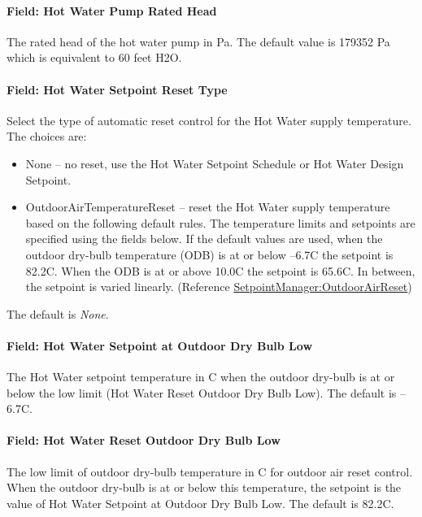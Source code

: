 \paragraph{Field: Hot Water Pump Rated Head}\label{field-hot-water-pump-rated-head}

The rated head of the hot water pump in Pa. The default value is 179352 Pa which is equivalent to 60 feet H2O.

\paragraph{Field: Hot Water Setpoint Reset Type}\label{field-hot-water-setpoint-reset-type}

Select the type of automatic reset control for the Hot Water supply temperature. The choices are:

\begin{itemize}
\item
  None -- no reset, use the Hot Water Setpoint Schedule or Hot Water Design Setpoint.
\item
  OutdoorAirTemperatureReset -- reset the Hot Water supply temperature based on the following default rules. The temperature limits and setpoints are specified using the fields below. If the default values are used, when the outdoor dry-bulb temperature (ODB) is at or below --6.7C the setpoint is 82.2C. When the ODB is at or above 10.0C the setpoint is 65.6C. In between, the setpoint is varied linearly. (Reference \hyperref[setpointmanageroutdoorairreset]{SetpointManager:OutdoorAirReset})
\end{itemize}

The default is \emph{None}.

\paragraph{Field: Hot Water Setpoint at Outdoor Dry Bulb Low}\label{field-hot-water-setpoint-at-outdoor-dry-bulb-low}

The Hot Water setpoint temperature in C when the outdoor dry-bulb is at or below the low limit (Hot Water Reset Outdoor Dry Bulb Low). The default is --6.7C.

\paragraph{Field: Hot Water Reset Outdoor Dry Bulb Low}\label{field-hot-water-reset-outdoor-dry-bulb-low}

The low limit of outdoor dry-bulb temperature in C for outdoor air reset control. When the outdoor dry-bulb is at or below this temperature, the setpoint is the value of Hot Water Setpoint at Outdoor Dry Bulb Low. The default is 82.2C.

